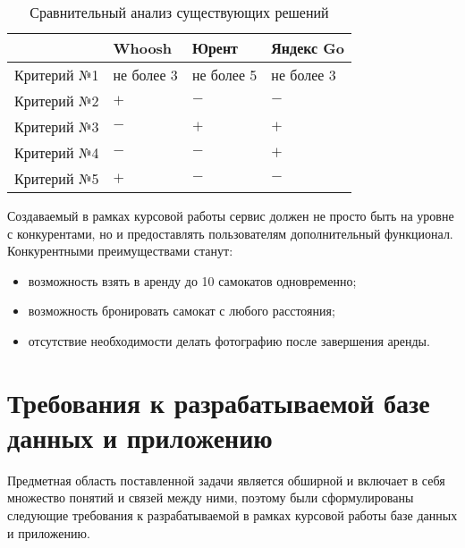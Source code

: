 \begin{table}[H]
	\caption{Сравнительный анализ существующих решений}
	\label{tbl:comparison}
	{\renewcommand{\arraystretch}{1.2}
		\begin{tabularx}{\textwidth}
			{
				| >{\raggedright\arraybackslash}X
				| >{\centering\arraybackslash}X
				| >{\centering\arraybackslash}X
				| >{\centering\arraybackslash}X |
			}
			\hline
			            & \textbf{Whoosh} & \textbf{Юрент} & \textbf{Яндекс Go} \\
			\hline
			Критерий №1 & не более 3      & не более 5     & не более 3         \\
			\hline
			Критерий №2 & $+$             & $-$            & $-$                \\
			\hline
			Критерий №3 & $-$             & $+$            & $+$                \\
			\hline
			Критерий №4 & $-$             & $-$            & $+$                \\
			\hline
			Критерий №5 & $+$             & $-$            & $-$                \\
			\hline
		\end{tabularx}}
\end{table}

Создаваемый в рамках курсовой работы сервис должен не просто быть на уровне с конкурентами, но и предоставлять пользователям дополнительный функционал. Конкурентными преимуществами станут:

\begin{itemize}
	\item возможность взять в аренду до 10 самокатов одновременно;
	\item возможность бронировать самокат с любого расстояния;
	\item отсутствие необходимости делать фотографию после завершения аренды.
\end{itemize}

\section{Требования к разрабатываемой базе данных и приложению}

Предметная область поставленной задачи является обширной и включает в себя множество понятий и связей между ними, поэтому были сформулированы следующие требования к разрабатываемой в рамках курсовой работы базе данных и приложению.

